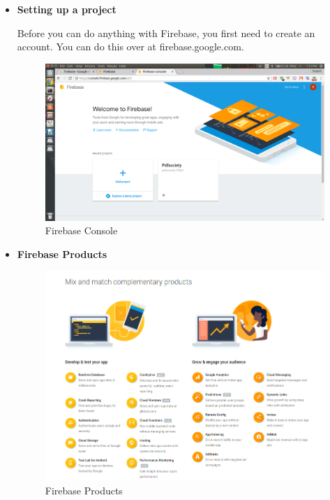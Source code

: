 \begin{itemize}

\item \textbf{Setting up a project}

Before you can do anything with Firebase, you first need to create an account. You can do this over at firebase.google.com.

\begin{figure}[ht]
\centering
\includegraphics[scale=0.20]{images/Pdf2.png}
\caption{Firebase Console}
\end{figure}

 

\item \textbf{Firebase Products}

\begin{itemize}

\begin{figure}[ht]
\centering
\includegraphics[scale=0.4]{images/Pdf1.png}
\caption{Firebase Products}
\end{figure}


\end{itemize}
\end{itemize}
